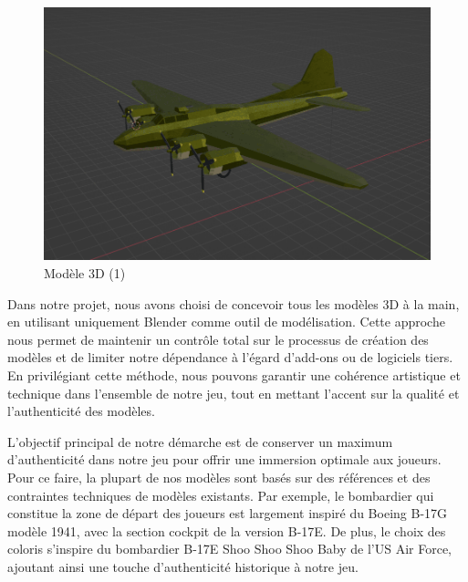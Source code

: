 \documentclass[
	article,			%
	11pt,				%
	oneside,			%
	a4paper,			%
	chapter=TITLE,
	french,			%
	sumario=tradicional
	]{base_nt}
\begin{document}
\begin{figure}[ht]
	\caption{Modèle 3D (1)}
	\centering
	\includegraphics[width=1\linewidth]{paper7.png}
	\legend{}
	
\end{figure}

Dans notre projet, nous avons choisi de concevoir tous les modèles 3D à la main, en utilisant uniquement Blender comme outil de modélisation. Cette approche nous permet de maintenir un contrôle total sur le processus de création des modèles et de limiter notre dépendance à l'égard d'add-ons ou de logiciels tiers. En privilégiant cette méthode, nous pouvons garantir une cohérence artistique et technique dans l'ensemble de notre jeu, tout en mettant l'accent sur la qualité et l'authenticité des modèles.

L'objectif principal de notre démarche est de conserver un maximum d'authenticité dans notre jeu pour offrir une immersion optimale aux joueurs. Pour ce faire, la plupart de nos modèles sont basés sur des références et des contraintes techniques de modèles existants. Par exemple, le bombardier qui constitue la zone de départ des joueurs est largement inspiré du Boeing B-17G modèle 1941, avec la section cockpit de la version B-17E. De plus, le choix des coloris s'inspire du bombardier B-17E Shoo Shoo Shoo Baby de l'US Air Force, ajoutant ainsi une touche d'authenticité historique à notre jeu.
\end{document}
